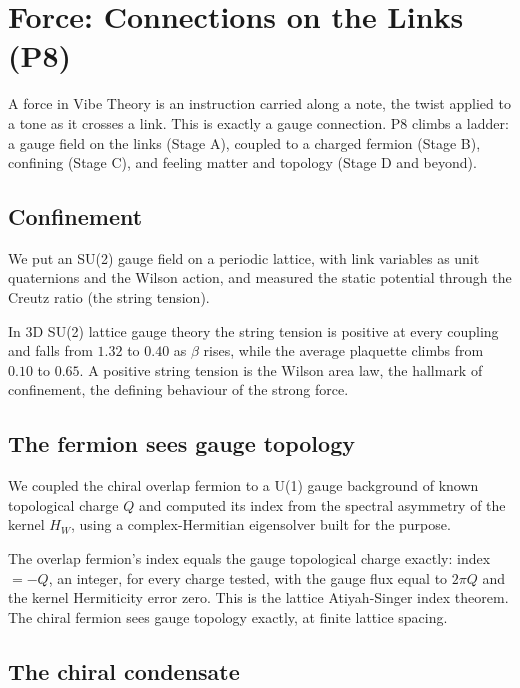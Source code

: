 \section{Force: Connections on the Links (P8)}
\label{sec:forces}

A force in Vibe Theory is an instruction carried along a note, the twist applied to a tone as it crosses a link. This is exactly a gauge connection. P8 climbs a ladder: a gauge field on the links (Stage A), coupled to a charged fermion (Stage B), confining (Stage C), and feeling matter and topology (Stage D and beyond).

\subsection{Confinement}

We put an SU(2) gauge field on a periodic lattice, with link variables as unit quaternions and the Wilson action, and measured the static potential through the Creutz ratio (the string tension).

\begin{result}
In 3D SU(2) lattice gauge theory the string tension is positive at every coupling and falls from $1.32$ to $0.40$ as $\beta$ rises, while the average plaquette climbs from $0.10$ to $0.65$. A positive string tension is the Wilson area law, the hallmark of confinement, the defining behaviour of the strong force.
\end{result}

\subsection{The fermion sees gauge topology}

We coupled the chiral overlap fermion to a U(1) gauge background of known topological charge $Q$ and computed its index from the spectral asymmetry of the kernel $H_W$, using a complex-Hermitian eigensolver built for the purpose.

\begin{result}
The overlap fermion's index equals the gauge topological charge exactly: index $= -Q$, an integer, for every charge tested, with the gauge flux equal to $2\pi Q$ and the kernel Hermiticity error zero. This is the lattice Atiyah-Singer index theorem. The chiral fermion sees gauge topology exactly, at finite lattice spacing.
\end{result}

\subsection{The chiral condensate}

